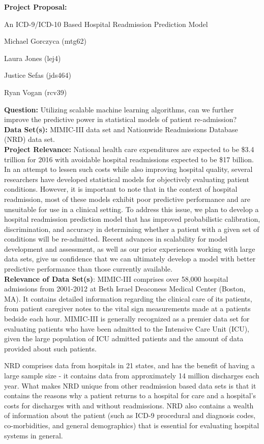 \documentclass [11pt]{article}
\begin{document}
\large
\centerline{{\bf Project Proposal:}}
\centerline{An ICD-9/ICD-10 Based Hospital Readmission Prediction Model}
\vspace{0.25in}
\small
\centerline{Michael Gorczyca (mtg62)}
\centerline{Laura Jones (lej4)}
\centerline{Justice Sefas (jds464)}
\centerline{Ryan Vogan (rcv39)}

\vspace{0.25in}
\large	
\noindent						
{\bf Question:}  Utilizing scalable machine learning algorithms, can we further improve the predictive power in statistical models of patient re-admission?\\

\noindent
{\bf Data Set(s):} MIMIC-III data set and Nationwide Readmissions Database (NRD) data set.\\

\noindent
{\bf Project Relevance:} National health care expenditures are expected to be \$3.4 trillion for 2016 with avoidable hospital readmissions expected to be \$17 billion. In an attempt to lessen such costs while also improving hospital quality, several researchers have developed statistical models for objectively evaluating patient conditions. However, it is important to note that in the context of hospital readmission, most of these models exhibit poor predictive performance and are unsuitable for use in a clinical setting. To address this issue, we plan to develop a hospital readmission prediction model that has improved probabilistic calibration, discrimination, and accuracy in determining whether a patient with a given set of conditions will be re-admitted. Recent advances in scalability for model development and assessment, as well as our prior experiences working with large data sets, give us  confidence that we can ultimately develop a model with better predictive performance than those currently available.\\

\noindent
{\bf Relevance of Data Set(s)}: MIMIC-III comprises over 58,000 hospital admissions from 2001-2012 at Beth Israel Deaconess Medical Center (Boston, MA). It contains detailed information regarding the clinical care of its patients, from patient caregiver notes to the vital sign measurements made at a patients bedside each hour. MIMIC-III is generally recognized as a premier data set for evaluating patients who have been admitted to the Intensive Care Unit (ICU), given the large population of ICU admitted patients and the amount of data provided about such patients.

\noindent
NRD comprises data from hospitals in 21 states, and has the benefit of having a large sample size - it contains data from approximately 14 million discharges each year. What makes NRD unique from other readmission based data sets is that it contains the reasons why a patient returns to a hospital for care and a hospital's costs for discharges with and without readmissions. NRD also contains a wealth of information about the patient (such as ICD-9 procedural and diagnosis codes, co-morbidities, and general demographics) that is essential for evaluating hospital systems in general.
\end{document}
